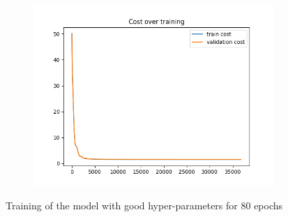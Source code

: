 \documentclass[a4paper]{article}
\begin{document}
\begin{figure}[h]
\begin{subfigure}{0.3\textwidth}
		\includegraphics[width=\linewidth]{images/Final_cycle_tracker_cost.png}
		\caption{}
	\end{subfigure}
	\caption{Training of the model with good hyper-parameters for 80 epochs}
	\label{fig:last}
\end{figure}







\end{document}
